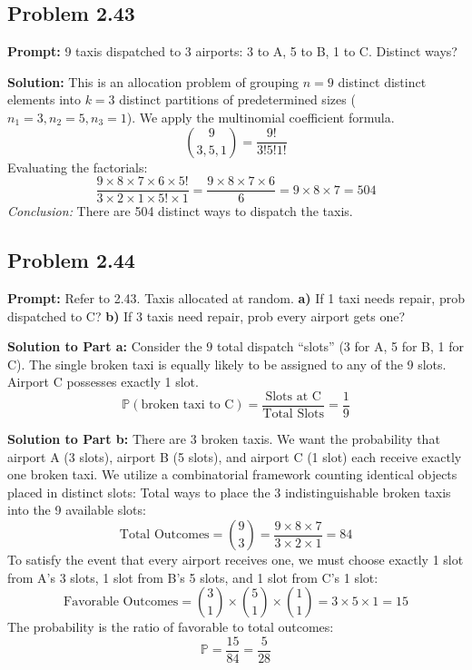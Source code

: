 \documentclass[11pt, letterpaper]{article}
\theoremstyle{definition}
\theoremstyle{remark}
\newcommand{\Prob}{\mathbb{P}}
\begin{document}
\subsection*{Problem 2.43}
\textbf{Prompt:} 9 taxis dispatched to 3 airports: 3 to A, 5 to B, 1 to C. Distinct ways?

\textbf{Solution:}
This is an allocation problem of grouping $n=9$ distinct distinct elements into $k=3$ distinct partitions of predetermined sizes ($n_{1}=3, n_{2}=5, n_{3}=1$). We apply the multinomial coefficient formula.
\[ \binom{9}{3, 5, 1} = \frac{9!}{3!5!1!} \]
Evaluating the factorials:
\[ \frac{9 \times 8 \times 7 \times 6 \times 5!}{3 \times 2 \times 1 \times 5! \times 1} = \frac{9 \times 8 \times 7 \times 6}{6} = 9 \times 8 \times 7 = 504 \]
\textit{Conclusion:} There are 504 distinct ways to dispatch the taxis.

\subsection*{Problem 2.44}
\textbf{Prompt:} Refer to 2.43. Taxis allocated at random. 
\textbf{a)} If 1 taxi needs repair, prob dispatched to C?
\textbf{b)} If 3 taxis need repair, prob every airport gets one?

\textbf{Solution to Part a:}
Consider the $9$ total dispatch ``slots'' (3 for A, 5 for B, 1 for C). The single broken taxi is equally likely to be assigned to any of the 9 slots. Airport C possesses exactly 1 slot.
\[ \Prob(\text{broken taxi to C}) = \frac{\text{Slots at C}}{\text{Total Slots}} = \frac{1}{9} \]

\textbf{Solution to Part b:}
There are 3 broken taxis. We want the probability that airport A (3 slots), airport B (5 slots), and airport C (1 slot) each receive exactly one broken taxi. We utilize a combinatorial framework counting identical objects placed in distinct slots:
Total ways to place the 3 indistinguishable broken taxis into the 9 available slots:
\[ \text{Total Outcomes} = \binom{9}{3} = \frac{9 \times 8 \times 7}{3 \times 2 \times 1} = 84 \]
To satisfy the event that every airport receives one, we must choose exactly 1 slot from A's 3 slots, 1 slot from B's 5 slots, and 1 slot from C's 1 slot:
\[ \text{Favorable Outcomes} = \binom{3}{1} \times \binom{5}{1} \times \binom{1}{1} = 3 \times 5 \times 1 = 15 \]
The probability is the ratio of favorable to total outcomes:
\[ \Prob = \frac{15}{84} = \frac{5}{28} \]
\end{document}
